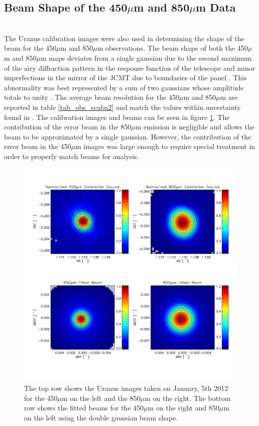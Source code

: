 \subsection{Beam Shape of the 450$\mu$m and 850$\mu$m Data} \\
The Uranus calibration images were also used in determining the shape of the beam for the 450$\mu$m and 850$\mu$m observations.  The beam shape of both the 450$\mu$m and 850$\mu$m maps deviates from a single gaussian due to the second maximum of the airy diffraction pattern in the response function of the telescope and minor imperfections in the mirror of the JCMT due to boundaries of the panel \citet{dempsey2013}.  This abnormality was best represented by a sum of two gaussians whose amplitude totals to unity \citep{dempsey2013}.  The average beam resolution for the 450$\mu$m and 850$\mu$m are reported in table \ref{tab_obs_scuba2} and match the values within uncertainty found in \citep{dempsey2013}.  The calibration images and beams can be seen in figure \ref{fig_calib}.  The contribution of the error beam in the 850$\mu$m emission is negligible and allows the beam to be approximated by a single gaussian.  However, the contribution of the error beam in the 450$\mu$m images was large enough to require special treatment in order to properly match beams for analysis.

\begin{figure}
  \label{fig_calib}
  \centering
  \includegraphics[scale=0.5]{obs_imgs/calib_beams.jpeg}
  \caption[SCUBA-2 Calibration and Beams]{The top row shows the Uranus images taken on January, 5th 2012 for the 450$\mu$m on the left and the 850$\mu$m on the right.  The bottom row shows the fitted beams for the 450$\mu$m on the right and 850$\mu$m on the left using the double gaussian beam shape.}
\end{figure}

